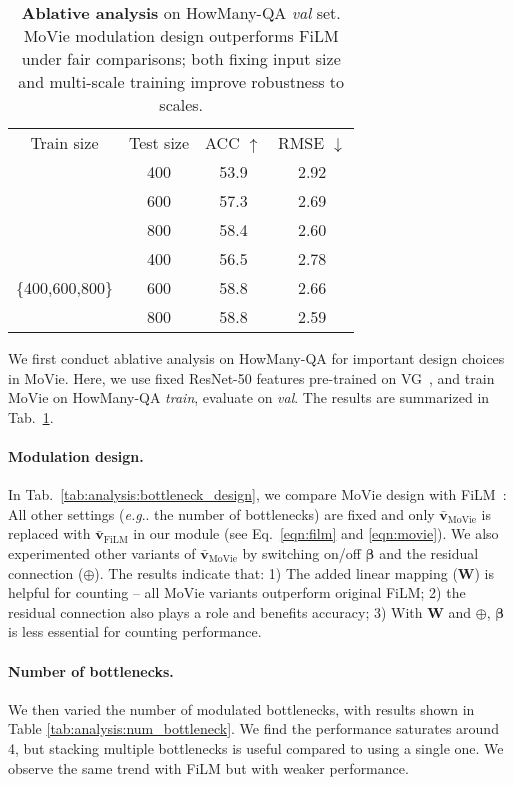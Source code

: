 \documentclass{article} \usepackage[dvipsnames,table]{xcolor}
\makeatletter
\def\rvv{{\mathbf{v}}}
\def\rmW{{\mathbf{W}}}
\newcommand{\ours}[0]{MoVie\xspace}
\newcommand{\tablestyle}[2]{\setlength{\tabcolsep}{#1}\renewcommand{\arraystretch}{#2}\centering\footnotesize}
\newcommand{\bbeta}{\mathbf{\beta}}
\DeclareRobustCommand\onedot{\futurelet\@let@token\@onedot}
\def\@onedot{\ifx\@let@token.\else.\null\fi\xspace}
\def\eg{\emph{e.g}\onedot} \def\Eg{\emph{E.g}\onedot}
\makeatother
\begin{document}
\begin{table}[t]
{
\tablestyle{4pt}{1.1}
\begin{tabular}{c|c|c|c}
Train size & Test size & ACC $\uparrow$ & RMSE $\downarrow$ \\
\shline
\multirow{3}{*}{800} & 400 & 53.9 & 2.92 \\
& 600 & 57.3 & 2.69 \\
& 800 & 58.4 & 2.60 \\
\hline
\multirow{3}{*}{\{400,600,800\}} & 400 & 56.5 & 2.78 \\
& 600 & 58.8 & 2.66 \\
& 800 & 58.8 & 2.59 \\
\end{tabular}
}
\smallskip
\caption{\label{tab:analysis}\textbf{Ablative analysis} on HowMany-QA \emph{val} set. \ours modulation design outperforms FiLM under fair comparisons; both fixing input size and multi-scale training improve robustness to scales.}
\end{table}


We first conduct ablative analysis on HowMany-QA for important design choices in \ours. Here, we use fixed ResNet-50 features pre-trained on VG~\cite{jiang2020defense}, and train \ours on HowMany-QA \emph{train}, evaluate on \emph{val}. The results are summarized in Tab.~\ref{tab:analysis}.

\paragraph{Modulation design.} In Tab.~\ref{tab:analysis:bottleneck_design}, we compare \ours design with FiLM~\cite{perez2018film}: All other settings (\eg the number of bottlenecks) are fixed and only $\bar{\rvv}_\text{MoVie}$ is replaced with $\bar{\rvv}_\text{FiLM}$ in our module (see Eq.~\ref{eqn:film} and \ref{eqn:movie}). We also experimented other variants of $\bar{\rvv}_\text{MoVie}$ by switching on/off $\bbeta$ and the residual connection ($\oplus$). The results indicate that: 1) The added linear mapping ($\rmW$) is helpful for counting -- all \ours variants outperform original FiLM; 2) the residual connection also plays a role and benefits accuracy; 3) With $\rmW$ and $\oplus$, $\bbeta$ is less essential for counting performance. 

\paragraph{Number of bottlenecks.} We then varied the number of modulated bottlenecks, with results shown in Table \ref{tab:analysis:num_bottleneck}. We find the performance saturates around 4, but stacking multiple bottlenecks is useful compared to using a single one. We observe the same trend with FiLM but with weaker performance.
\end{document}
